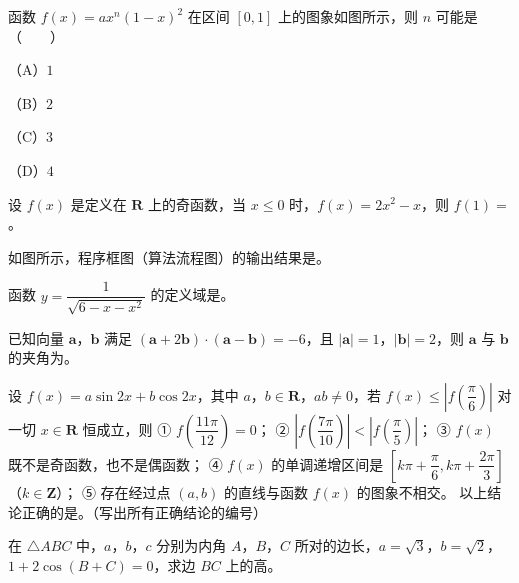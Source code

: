 \begin{question}
函数 $f(x)=ax^n(1-x)^2$ 在区间 $[0,1]$ 上的图象如图所示，则 $n$ 可能是\mbox{（　　）}

（A）$1$

（B）$2$

（C）$3$

（D）$4$
\nopagebreak[4]
\begin{center}\end{center}
\nopagebreak[4]
\end{question}
\begin{question}
设 $f(x)$ 是定义在 $\mathbf R$ 上的奇函数，当 $x\leqslant0$ 时，$f(x)=2x^2-x$，则 $f(1)=$\gkblank{}。
\Needspace{0.4\textheight}
\end{question}
\begin{question}
如图所示，程序框图（算法流程图）的输出结果是\gkblank{}。
\nopagebreak[4]
\begin{center}\end{center}
\nopagebreak[4]
\end{question}
\begin{question}
函数 $y=\dfrac{1}{\sqrt{6-x-x^2}}$ 的定义域是\gkblank{}。
\end{question}
\begin{question}
已知向量 $\boldsymbol a$，$\boldsymbol b$ 满足 $(\boldsymbol a+2\boldsymbol b)\cdot(\boldsymbol a-\boldsymbol b)=-6$，且 $|\boldsymbol a|=1$，$|\boldsymbol b|=2$，则 $\boldsymbol a$ 与 $\boldsymbol b$ 的夹角为\gkblank{}。
\end{question}
\begin{question}
设 $f(x)=a\sin2x+b\cos2x$，其中 $a$，$b\in\mathbf R$，$ab\neq0$，若 $f(x)\leqslant\left|f\left(\dfrac{\pi}{6}\right)\right|$ 对一切 $x\in\mathbf R$ 恒成立，则
① $f\left(\dfrac{11\pi}{12}\right)=0$；
② $\left|f\left(\dfrac{7\pi}{10}\right)\right|<\left|f\left(\dfrac{\pi}{5}\right)\right|$；
③ $f(x)$ 既不是奇函数，也不是偶函数；
④ $f(x)$ 的单调递增区间是 $\left[k\pi+\dfrac{\pi}{6},k\pi+\dfrac{2\pi}{3}\right]$（$k\in\mathbf Z$）；
⑤ 存在经过点 $(a,b)$ 的直线与函数 $f(x)$ 的图象不相交。
以上结论正确的是\gkblank{}。（写出所有正确结论的编号）
\end{question}
\begin{question}
在 $\triangle ABC$ 中，$a$，$b$，$c$ 分别为内角 $A$，$B$，$C$ 所对的边长，$a=\sqrt3$，$b=\sqrt2$，$1+2\cos(B+C)=0$，求边 $BC$ 上的高。
\end{question}
